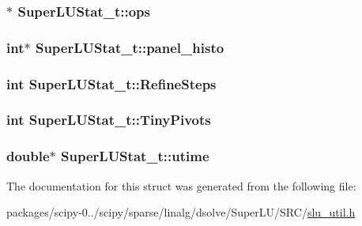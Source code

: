 \subsubsection[{ops}]{$\ast$ Super\+L\+U\+Stat\+\_\+t\+::ops}\label{structSuperLUStat__t_aec6afa389e49ac9d04dc44e24805c99d}
\hypertarget{structSuperLUStat__t_a9a15399d38ecaf731ec300977f268b75}{}
\subsubsection[{panel\+\_\+histo}]{\setlength{\rightskip}{0pt plus 5cm}int$\ast$ Super\+L\+U\+Stat\+\_\+t\+::panel\+\_\+histo}\label{structSuperLUStat__t_a9a15399d38ecaf731ec300977f268b75}
\hypertarget{structSuperLUStat__t_a472eadaf612c983b8829ae40b09f411b}{}
\subsubsection[{Refine\+Steps}]{\setlength{\rightskip}{0pt plus 5cm}int Super\+L\+U\+Stat\+\_\+t\+::\+Refine\+Steps}\label{structSuperLUStat__t_a472eadaf612c983b8829ae40b09f411b}
\hypertarget{structSuperLUStat__t_ad752e80fc9fa85195ec9c0e9a17b481c}{}
\subsubsection[{Tiny\+Pivots}]{\setlength{\rightskip}{0pt plus 5cm}int Super\+L\+U\+Stat\+\_\+t\+::\+Tiny\+Pivots}\label{structSuperLUStat__t_ad752e80fc9fa85195ec9c0e9a17b481c}
\hypertarget{structSuperLUStat__t_a5eccc9eba32b749c87f7a97991cfdc18}{}
\subsubsection[{utime}]{\setlength{\rightskip}{0pt plus 5cm}double$\ast$ Super\+L\+U\+Stat\+\_\+t\+::utime}\label{structSuperLUStat__t_a5eccc9eba32b749c87f7a97991cfdc18}


The documentation for this struct was generated from the following file\+:\begin{DoxyCompactItemize}
\item 
packages/scipy-\/0../scipy/sparse/linalg/dsolve/\+Super\+L\+U/\+S\+R\+C/\hyperlink{slu__util_8h}{slu\+\_\+util.\+h}\end{DoxyCompactItemize}
